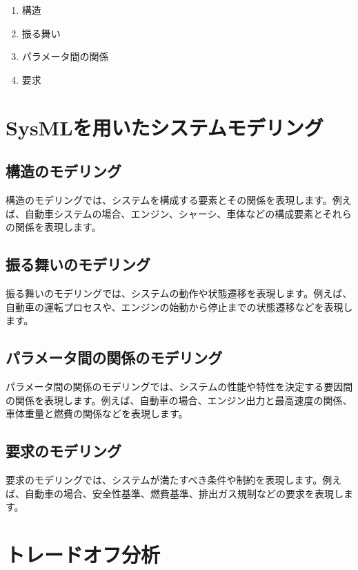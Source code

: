 \begin{enumerate}
    \item 構造
    \item 振る舞い
    \item パラメータ間の関係
    \item 要求
\end{enumerate}

\section{SysMLを用いたシステムモデリング}

\subsection{構造のモデリング}

構造のモデリングでは、システムを構成する要素とその関係を表現します。例えば、自動車システムの場合、エンジン、シャーシ、車体などの構成要素とそれらの関係を表現します。

\subsection{振る舞いのモデリング}

振る舞いのモデリングでは、システムの動作や状態遷移を表現します。例えば、自動車の運転プロセスや、エンジンの始動から停止までの状態遷移などを表現します。

\subsection{パラメータ間の関係のモデリング}

パラメータ間の関係のモデリングでは、システムの性能や特性を決定する要因間の関係を表現します。例えば、自動車の場合、エンジン出力と最高速度の関係、車体重量と燃費の関係などを表現します。

\subsection{要求のモデリング}

要求のモデリングでは、システムが満たすべき条件や制約を表現します。例えば、自動車の場合、安全性基準、燃費基準、排出ガス規制などの要求を表現します。

\section{トレードオフ分析}

